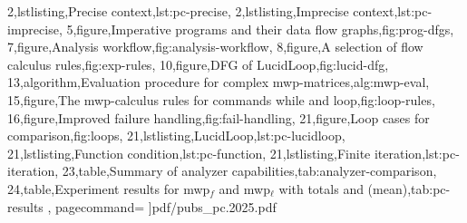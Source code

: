 {        2,lstlisting,{Precise context},lst:pc-precise,
        2,lstlisting,{Imprecise context},lst:pc-imprecise,
        5,figure,{Imperative programs and their data flow graphs},fig:prog-dfgs,
        7,figure,{Analysis workflow},fig:analysis-workflow,
        8,figure,{A selection of flow calculus rules},fig:exp-rules,
        10,figure,{DFG of LucidLoop},fig:lucid-dfg,
        13,algorithm,{Evaluation procedure for complex mwp-matrices},alg:mwp-eval,
        15,figure,{The mwp-calculus rules for commands while and loop},fig:loop-rules,
        16,figure,{Improved failure handling},fig:fail-handling,
        21,figure,{Loop cases for comparison},fig:loops,
        21,lstlisting,{LucidLoop},lst:pc-lucidloop,
        21,lstlisting,{Function condition},lst:pc-function,
        21,lstlisting,{Finite iteration},lst:pc-iteration,
        23,table,{Summary of analyzer capabilities},tab:analyzer-comparison,
        24,table,{Experiment results for mwp$_f$ and mwp$_\ell$ with totals and (mean)},tab:pc-results
    },
    pagecommand={\thispagestyle{empty}%
    }]{pdf/pubs_pc.2025.pdf}